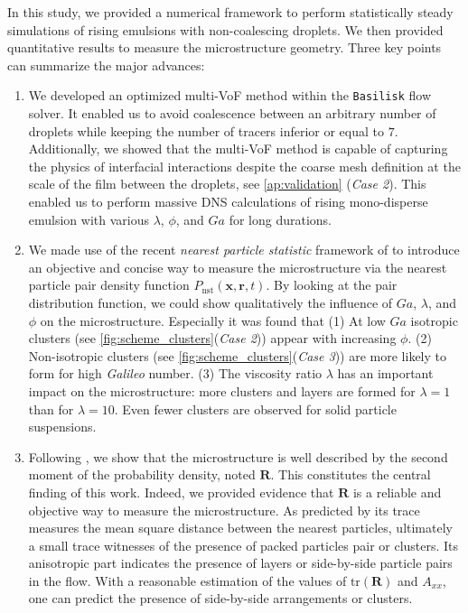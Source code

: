 \documentclass[11pt]{My_preprint}
\begin{document}
In this study, we provided a numerical framework to perform statistically steady simulations of rising emulsions with non-coalescing droplets. 
We then provided quantitative results to measure the microstructure geometry.
Three key points can summarize the major advances:
\begin{enumerate}
\item We developed an optimized multi-VoF method within the \texttt{Basilisk} flow solver. 
    It enabled us to avoid coalescence between an arbitrary number of droplets while keeping the number of tracers inferior or equal to $7$. 
    Additionally, we showed that the multi-VoF method is capable of capturing the physics of interfacial interactions despite the coarse mesh definition at the scale of the film between the droplets, see \ref{ap:validation} (\textit{Case 2}). 
    This enabled us to perform massive DNS calculations of rising mono-disperse emulsion with various $\lambda$, $\phi$, and $Ga$ for long durations.
    \item We made use of the recent \textit{nearest particle statistic} framework of \citet{zhang2023evolution} to introduce an objective and concise way to measure the microstructure via the nearest particle pair density function $P_\text{nst}(\textbf{x},\textbf{r},t)$. 
    By looking at the pair distribution function, we could show qualitatively the influence of $Ga$, $\lambda$, and $\phi$ on the microstructure.
    Especially it was found that 
    (1) At low $Ga$ isotropic clusters (see \ref{fig:scheme_clusters}(\textit{Case 2})) appear with increasing $\phi$. 
    (2) Non-isotropic clusters (see \ref{fig:scheme_clusters}(\textit{Case 3})) are more likely to form for high \textit{Galileo} number.
    (3) The viscosity ratio $\lambda$ has an important impact on the microstructure: more clusters and layers are formed for $\lambda = 1$ than for $\lambda = 10$. 
    Even fewer clusters are observed for solid particle suspensions. 
    \item Following \citet{zhang2023evolution}, we show that the microstructure is well described by the second moment of the probability density, noted $\textbf{R}$. 
    This constitutes the central finding of this work. Indeed, we provided evidence that $\textbf{R}$ is a reliable and objective way to measure the microstructure.
    As predicted by \citet{zhang2023evolution} its trace measures the mean square distance between the nearest particles, ultimately a small trace witnesses of the presence of packed particles pair or clusters.
    Its anisotropic part indicates the presence of layers or side-by-side particle pairs in the flow. 
    With a reasonable estimation of the values of $\text{tr}(\textbf{R})$ and $A_{xx}$, one can predict the presence of side-by-side arrangements or clusters.
\end{enumerate}
\end{document}

